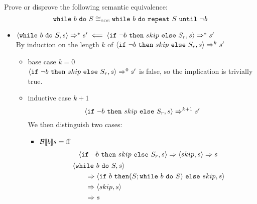\begin{exercise}{
    Prove or disprove the following semantic equivalence:
    \[ \texttt{while}\ b\ \texttt{do}\ S \cong_{\text{\tiny SOS}} \texttt{while}\ b\ \texttt{do}\ \texttt{repeat}\ S\ \texttt{until}\ \neg b  \]\vspace*{-0.6cm}
}
\begin{itemize}
\begin{itemize}
\begin{itemize}
                        And since $\instr{\wwhile{b}{S}}{s''} \Rightarrow^{k_2} s'$ and $k_2 = k - 2 - k_1 \leq k$  we can apply the inductive hypothesis and get
                        \[ \instr{\texttt{if}\ \neg b\ \texttt{then}\ skip\ \texttt{else}\ S_r}{s''} \Rightarrow s' \]
                \end{itemize}
            \end{itemize}
        \item $\instr{\wwhile{b}{S}}{s} \Rightarrow^* s' \impliedby \instr{\texttt{if}\ \neg b\ \texttt{then}\ skip\ \texttt{else}\ S_r}{s} \Rightarrow^* s'$ \\
            By induction on the length $k$ of $\instr{\texttt{if}\ \neg b\ \texttt{then}\ skip\ \texttt{else}\ S_r}{s} \Rightarrow^k s'$
            \begin{itemize}
                \item base case $k=0$ \\
                $\instr{\texttt{if}\ \neg b\ \texttt{then}\ skip\ \texttt{else}\ S_r}{s} \Rightarrow^0 s'$ is false, so the implication is trivially true.
                \item inductive case $k+1$ \vspace*{-0.3cm}
                \[ \instr{\texttt{if}\ \neg b\ \texttt{then}\ skip\ \texttt{else}\ S_r}{s} \Rightarrow^{k+1} s' \]
                We then distinguish two cases:
                \begin{itemize}
                    \item $\mathcal{B} \llbracket  b \rrbracket s = \text{ff}$
                    \begin{gather*}
                        \instr{\texttt{if}\ \neg b\ \texttt{then}\ skip\ \texttt{else}\ S_r}{s}
                        \Rightarrow
                        \instr{skip}{s}
                        \Rightarrow s
                        \\
                        \begin{align*}
                            &\instr{\wwhile{b}{S}}{s}
                            \\&\qquad\Rightarrow \instr{\texttt{if}\ b\ \texttt{then} (S; \wwhile{b}{S})\ \texttt{else}\ skip}{s}
                            \\&\qquad\Rightarrow \instr{skip}{s}
                            \\&\qquad\Rightarrow s
                        \end{align*}
                    \end{gather*}

\end{itemize}
\end{itemize}
\end{itemize}
\end{exercise}
